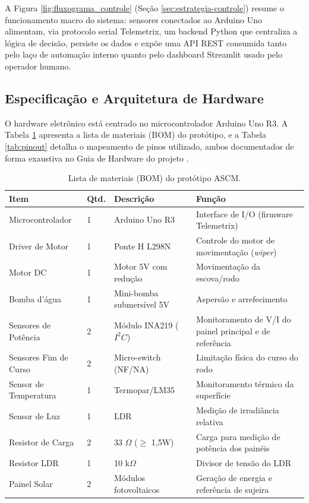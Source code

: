 \documentclass[12pt, a4paper]{article}
\begin{document}
A Figura \ref{fig:fluxograma_controle} (Seção \ref{sec:estrategia-controle}) resume o funcionamento macro do sistema: sensores conectados ao Arduino Uno alimentam, via protocolo serial Telemetrix, um backend Python que centraliza a lógica de decisão, persiste os dados e expõe uma API REST consumida tanto pelo laço de automação interno quanto pelo dashboard Streamlit usado pelo operador humano.

\subsection{Especificação e Arquitetura de Hardware}

O hardware eletrônico está centrado no microcontrolador Arduino Uno R3. A Tabela \ref{tab:bom} apresenta a lista de materiais (BOM) do protótipo, e a Tabela \ref{tab:pinout} detalha o mapeamento de pinos utilizado, ambos documentados de forma exaustiva no Guia de Hardware do projeto \cite{electronics_guide}.

\begin{table}[htbp]
    \centering
    \caption{Lista de materiais (BOM) do protótipo ASCM.}
    \label{tab:bom}
    \begin{tabular}{p{3.2cm}p{1.2cm}p{4.0cm}p{4.4cm}}
    \toprule
    \textbf{Item} & \textbf{Qtd.} & \textbf{Descrição} & \textbf{Função} \\
    \midrule
    Microcontrolador & 1 & Arduino Uno R3 & Interface de I/O (firmware Telemetrix) \\
    Driver de Motor & 1 & Ponte H L298N & Controle do motor de movimentação (\textit{wiper}) \\
    Motor DC & 1 & Motor 5V com redução & Movimentação da escova/rodo \\
    Bomba d'água & 1 & Mini-bomba submersível 5V & Aspersão e arrefecimento \\
    Sensores de Potência & 2 & Módulo INA219 ($I^2C$) & Monitoramento de V/I do painel principal e de referência \\
    Sensores Fim de Curso & 2 & Micro-switch (NF/NA) & Limitação física do curso do rodo \\
    Sensor de Temperatura & 1 & Termopar/LM35 & Monitoramento térmico da superfície \\
    Sensor de Luz & 1 & LDR & Medição de irradiância relativa \\
    Resistor de Carga & 2 & 33 $\Omega$ ($\geq$ 1,5W) & Carga para medição de potência dos painéis \\
    Resistor LDR & 1 & 10 k$\Omega$ & Divisor de tensão do LDR \\
    Painel Solar & 2 & Módulos fotovoltaicos & Geração de energia e referência de sujeira \\
    \bottomrule
    \end{tabular}
\end{table}
\end{document}
